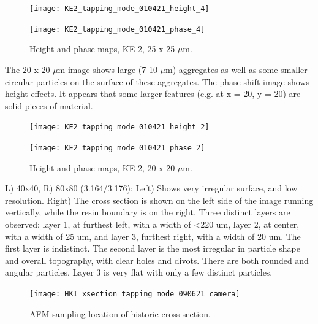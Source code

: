 \begin{figure}[H]
\centering
\begin{minipage}{.45\textwidth}
  \centering
  \texttt{[image: KE2\_tapping\_mode\_010421\_height\_4]}
\end{minipage}
\begin{minipage}{.45\textwidth}
  \centering
  \texttt{[image: KE2\_tapping\_mode\_010421\_phase\_4]}
\end{minipage}
\caption[Height and phase maps, KE 2]{Height and phase maps, KE 2, 25 x 25 $\mu$m.}
\label{fig:afm_ke2_height_phase_5}
\end{figure}

The 20 x 20 $\mu$m image shows large (7-10 $\mu$m) aggregates as well as some smaller circular particles on the surface of these aggregates. The phase shift image shows height effects. It appears that some larger features (e.g. at x = 20, y = 20) are solid pieces of material. 


\begin{figure}[H]
\centering
\begin{minipage}{.45\textwidth}
  \centering
  \texttt{[image: KE2\_tapping\_mode\_010421\_height\_2]}
\end{minipage}
\begin{minipage}{.45\textwidth}
  \centering
  \texttt{[image: KE2\_tapping\_mode\_010421\_phase\_2]}
\end{minipage}
\caption[Height and phase maps, KE 2]{Height and phase maps, KE 2, 20 x 20 $\mu$m.}
\label{fig:afm_ke2_height_phase_6}
\end{figure}



L) 40x40, R) 80x80 (3.164/3.176): Left) Shows very irregular surface, and low resolution. Right) The cross section is shown on the left side of the image running vertically, while the resin boundary is on the right. Three distinct layers are observed: layer 1, at furthest left, with a width of <220 um, layer 2, at center, with a width of 25 um, and layer 3, furthest right, with a width of 20 um. The first layer is indistinct. The second layer is the most irregular in particle shape and overall topography, with clear holes and divots. There are both rounded and angular particles. Layer 3 is very flat with only a few distinct particles.


\begin{figure}[H]
\centering
  \texttt{[image: HKI\_xsection\_tapping\_mode\_090621\_camera]}
\caption[AFM sampling location of historic cross section]{AFM sampling location of historic cross section.}
\label{fig:camera_hki_xsection}
\end{figure}


